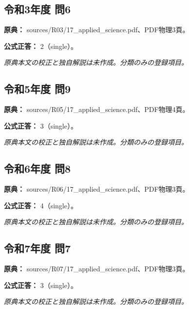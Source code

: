 \subsection{令和3年度 問6}
\label{q:r03-reg-applied-06}

\noindent\textbf{原典：} sources/R03/17\_applied\_science.pdf、PDF物理3頁。

\textbf{公式正答：} 2（single）。

\par\textit{原典本文の校正と独自解説は未作成。分類のみの登録項目。}

\subsection{令和5年度 問9}
\label{q:r05-reg-applied-09}

\noindent\textbf{原典：} sources/R05/17\_applied\_science.pdf、PDF物理4頁。

\textbf{公式正答：} 3（single）。

\par\textit{原典本文の校正と独自解説は未作成。分類のみの登録項目。}

\subsection{令和6年度 問8}
\label{q:r06-reg-applied-08}

\noindent\textbf{原典：} sources/R06/17\_applied\_science.pdf、PDF物理3頁。

\textbf{公式正答：} 4（single）。

\par\textit{原典本文の校正と独自解説は未作成。分類のみの登録項目。}

\subsection{令和7年度 問7}
\label{q:r07-reg-applied-07}

\noindent\textbf{原典：} sources/R07/17\_applied\_science.pdf、PDF物理3頁。

\textbf{公式正答：} 3（single）。

\par\textit{原典本文の校正と独自解説は未作成。分類のみの登録項目。}
